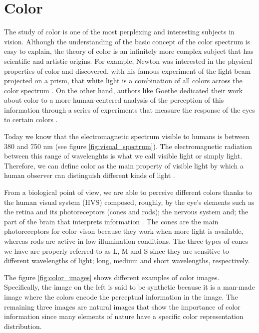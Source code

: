 \section{Color}
The study of color is one of the most perplexing and interesting subjects in vision. Although the understanding of the basic concept of the color spectrum is easy to explain, the theory of color is an infinitely more complex subject that has scientific and artistic origins. For example, Newton was interested in the physical properties of color and discovered, with his famous experiment of the light beam projected on a prism, that white light is a combination of all colors across the color spectrum \citep{Newton:Book:1704}.  On the other hand, authors like Goethe dedicated their work about color to a more human-centered analysis of the perception of this information through a series of experiments that measure the response of the eyes to certain colors \citep{Goethe:Book:2015}.

Today we know that the electromagnetic spectrum visible to humans is between 380 and 750 nm (see figure \ref{fig:visual_spectrum}). The electromagnetic radiation between this range of wavelenghts is what we call visible light or simply light. Therefore, we can define color as the main property of visible light by which a human observer can distinguish different kinds of light \citep{Kerr:Online:2003}.

From a biological point of view, we are able to perceive different colors thanks to the human visual system (HVS) composed, roughly, by the eye's elements such as the retina and its photoreceptors (cones and rods); the nervous system and; the part of the brain that interprets information \citep{Fairchild:Book:2005}. The cones are the main photoreceptors for color vison because they work when more light is available, whereas rods are active in low illumination conditions. The three types of cones we have are properly referred to as L, M and S since they are sensitive to different wavelengths of light; long, medium and short wavelengths, respectively.

The figure \ref{fig:color_images} shows different examples of color images. Specifically, the image on the left is said to be synthetic because it is a man-made image where the colors encode the perceptual information in the image. The remaining three images are natural images that show the importance of color information since many elements of nature have a specific color representation distribution.

